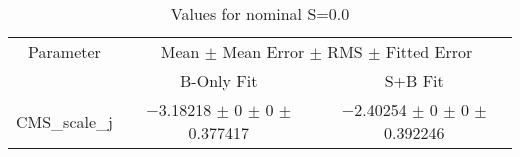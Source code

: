 \begin{table}
\centering
\caption{Values for nominal S=0.0}
\begin{tabular}{ccc}
\toprule
Parameter & \multicolumn{2}{c}{Mean $\pm$ Mean Error $\pm$ RMS $\pm$ Fitted Error}\\
 & B-Only Fit & S+B Fit\\
\midrule
CMS\_scale\_j & \num{-3.18218} $\pm$ \num{0} $\pm$ \num{0} $\pm$ \num{0.377417} & \num{-2.40254} $\pm$ \num{0} $\pm$ \num{0} $\pm$ \num{0.392246}\\
\bottomrule
\end{tabular}
\end{table}
